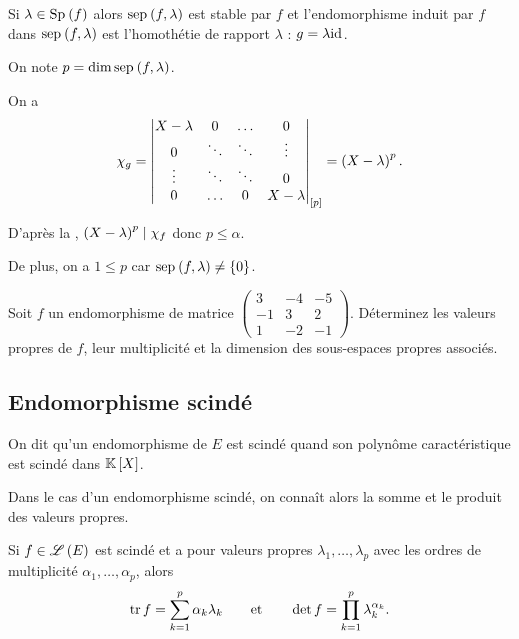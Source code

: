 \begin{dem}
Si \(\lambda\in\Sp{f}\) alors \(\sep{f}{\lambda}\) est stable par \(f\) et l'endomorphisme induit par \(f\) dans \(\sep{f}{\lambda}\) est l'homothétie de rapport \(\lambda\) : \(g=\lambda\mathrm{id}_{}\).

On note \(p=\dim\sep{f}{\lambda}\).

On a \[\chi_g=\begin{vmatrix}
X-\lambda & 0 & \dots & 0 \\
0 & \ddots & \ddots & \vdots \\
\vdots & \ddots & \ddots & 0 \\
0 & \dots & 0 & X-\lambda
\end{vmatrix}_{\left[p\right]}=\left(X-\lambda\right)^p.\]

D'après la , \(\left(X-\lambda\right)^p\mid\chi_f\) donc \(p\leq\alpha\).

De plus, on a \(1\leq p\) car \(\sep{f}{\lambda}\not=\accol{0}\).
\end{dem}

\begin{exo}
Soit \(f\) un endomorphisme de matrice \(\begin{pmatrix}
3 & -4 & -5 \\
-1 & 3 & 2 \\
1 & -2 & -1
\end{pmatrix}\). Déterminez les valeurs propres de \(f\), leur multiplicité et la dimension des sous-espaces propres associés.
\end{exo}

\subsection{Endomorphisme scindé}

\begin{defi}
On dit qu'un endomorphisme de \(E\) est scindé quand son polynôme caractéristique est scindé dans \(\poly\).
\end{defi}

Dans le cas d'un endomorphisme scindé, on connaît alors la somme et le produit des valeurs propres.

\begin{prop}
Si \(f\in\mathscr{L}\left(E\right)\) est scindé et a pour valeurs propres \(\lambda_1,\dots,\lambda_p\) avec les ordres de multiplicité \(\alpha_1,\dots,\alpha_p\), alors \[\operatorname{tr} f=\sum_{k=1}^p\alpha_k\lambda_k\qquad\text{et}\qquad\det f=\prod_{k=1}^p\lambda_k^{\alpha_k}.\]
\end{prop}


